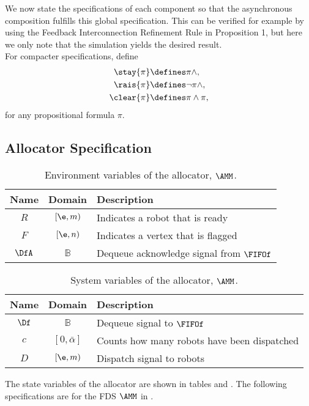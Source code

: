 We now state the specifications of each component so that the asynchronous composition fulfills this global specification. This can be verified for example by using the Feedback Interconnection Refinement Rule in Proposition 1, but here we only note that the simulation yields the desired result.\\

For compacter specifications, define
\begin{align*}
\stay{\pi} &\defines \pi \wedge \next \pi, \\
\rais{\pi} &\defines \neg \pi \wedge \next \pi, \\
\clear{\pi} &\defines \pi \wedge \next \neg \pi,
\end{align*}
for any propositional formula $\pi$.\\

\subsection{Allocator Specification}

\begin{table}
\centering
\begin{tabular}{c|c|l}
\hline
Name & Domain & Description \\
\hline
$R$ & $[\e, m)$ & Indicates a robot that is ready \\
$F$ & $[\e, n)$ & Indicates a vertex that is flagged \\
$\DfA$ & $\mathbb{B}$ & Dequeue acknowledge signal from $\FIFOf$ \\
\hline
\end{tabular}
\caption{Environment variables of the allocator, $\AMM$.}
\label{tab:env:alloc}
\end{table}

\begin{table}
\centering
\begin{tabular}{c|c|l}
\hline
Name & Domain & Description \\
\hline
$\Df$ & $\mathbb{B}$ & Dequeue signal to $\FIFOf$ \\
$c$ & $[0, \bar{\alpha}]$ & Counts how many robots have been dispatched \\
$D$ & $[\e, m)$ & Dispatch signal to robots \\
\hline
\end{tabular}
\caption{System variables of the allocator, $\AMM$.}
\label{tab:sys:alloc}
\end{table}

The state variables of the allocator are shown in tables  and . The following specifications are for the FDS $\AMM$ in .\\ 


